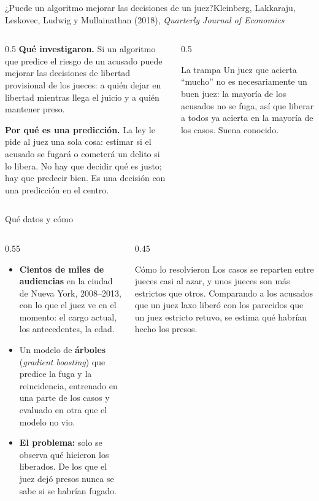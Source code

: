 \documentclass{beamer}
\begin{document}
\begin{frame}{¿Puede un algoritmo mejorar las decisiones de un juez?}{Kleinberg, Lakkaraju, Leskovec, Ludwig y Mullainathan (2018), \emph{Quarterly Journal of Economics}}
\begin{columns}[T]
\begin{column}{0.5\textwidth}
\textbf{Qué investigaron.} Si un algoritmo que predice el riesgo de un acusado puede mejorar las decisiones de libertad provisional de los jueces: a quién dejar en libertad mientras llega el juicio y a quién mantener preso.

\medskip
\textbf{Por qué es una predicción.} La ley le pide al juez una sola cosa: estimar si el acusado se fugará o cometerá un delito si lo libera. No hay que decidir qué es justo; hay que predecir bien. Es una decisión con una predicción en el centro.
\end{column}
\begin{column}{0.5\textwidth}
\begin{block}{La trampa}
Un juez que acierta ``mucho'' no es necesariamente un buen juez: la mayoría de los acusados no se fuga, así que liberar a todos ya acierta en la mayoría de los casos. Suena conocido.
\end{block}
\end{column}
\end{columns}
\end{frame}

\begin{frame}{Qué datos y cómo}
\begin{columns}[T]
\begin{column}{0.55\textwidth}
\begin{itemize}\itemsep5pt
  \item \textbf{Cientos de miles de audiencias} en la ciudad de Nueva York, 2008--2013, con lo que el juez ve en el momento: el cargo actual, los antecedentes, la edad.
  \item Un modelo de \textbf{árboles} (\emph{gradient boosting}) que predice la fuga y la reincidencia, entrenado en una parte de los casos y evaluado en otra que el modelo no vio.
  \item \textbf{El problema:} solo se observa qué hicieron los liberados. De los que el juez dejó presos nunca se sabe si se habrían fugado.
\end{itemize}
\end{column}
\begin{column}{0.45\textwidth}
\begin{exampleblock}{Cómo lo resolvieron}
Los casos se reparten entre jueces casi al azar, y unos jueces son más estrictos que otros. Comparando a los acusados que un juez laxo liberó con los parecidos que un juez estricto retuvo, se estima qué habrían hecho los presos.
\end{exampleblock}
\end{column}
\end{columns}
\end{frame}
\end{document}
